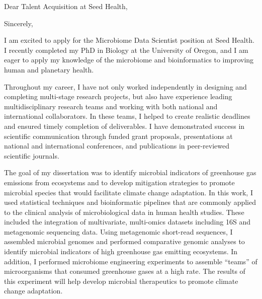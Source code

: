 \documentclass[11pt,letterpaper,sans]{moderncv}        %
\begin{document}

\clearpage
\date{March 11, 2023}
\opening{Dear Talent Acquisition at Seed Health,}
\closing{Sincerely,}
\makelettertitle

I am excited to apply for the Microbiome Data Scientist position at Seed Health.
I recently completed my PhD in Biology at the University of Oregon, and I am
eager to apply my knowledge of the microbiome and bioinformatics to improving
human and planetary health.

Throughout my career, I have not only worked independently in designing and
completing multi-stage research projects, but also have experience leading
multidisciplinary research teams and working with both national and
international collaborators. In these teams, I helped to create realistic
deadlines and ensured timely completion of deliverables. I have demonstrated
success in scientific communication through funded grant proposals,
presentations at national and international conferences, and publications in
peer-reviewed scientific journals. 

The goal of my dissertation was to identify microbial indicators of greenhouse
gas emissions from ecosystems and to develop mitigation strategies to promote
microbial species that would facilitate climate change adaptation. 
In this work, I used statistical techniques and bioinformatic
pipelines that are commonly applied to the clinical analysis of microbiological
data in human health studies. These included the integration of multivariate,
multi-omics datasets including 16S and metagenomic sequencing data. Using
metagenomic short-read sequences, I assembled microbial genomes and performed
comparative genomic analyses to identify microbial indicators of high
greenhouse gas emitting ecosystems. In addition, I performed microbiome engineering
experiments to assemble ``teams'' of microorganisms that consumed greenhouse
gases at a high rate. The results of this experiment will help develop
microbial therapeutics to promote climate change adaptation.
\end{document}
